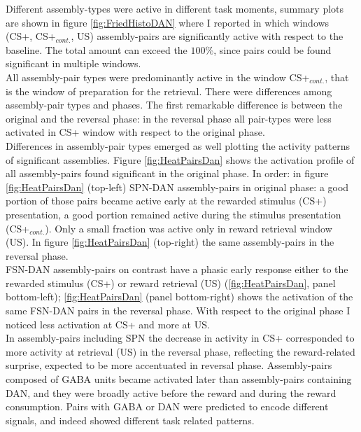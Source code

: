 Different assembly-types were active in different task moments, summary plots are shown in figure \ref{fig:FriedHistoDAN} where I reported in which windows (CS+, CS+$_{cont.}$, US) assembly-pairs are significantly active with respect to the baseline. The total amount can exceed the $100\%$, since pairs could be found significant in multiple windows.\\All assembly-pair types were predominantly active in the window CS+$_{cont.}$, that is the window of preparation for the retrieval. There were differences among assembly-pair types and phases. The first remarkable difference is between the original and the reversal phase: in the reversal phase all pair-types were less activated in CS+ window with respect to the original phase.\\Differences in assembly-pair types emerged as well plotting the activity patterns of significant assemblies. Figure \ref{fig:HeatPairsDan} shows the activation profile of all assembly-pairs found significant in the original phase. In order: in figure \ref{fig:HeatPairsDan} (top-left) SPN-DAN assembly-pairs in original phase: a good portion of those pairs became active early at the rewarded stimulus (CS+) presentation, a good portion remained active during the stimulus presentation (CS+$_{cont.}$). Only a small fraction was active only in reward retrieval window (US). In figure \ref{fig:HeatPairsDan} (top-right) the same assembly-pairs in the reversal phase.\\FSN-DAN assembly-pairs on contrast have a phasic early response either to the rewarded stimulus (CS+) or reward retrieval (US) (\ref{fig:HeatPairsDan}, panel bottom-left); \ref{fig:HeatPairsDan} (panel bottom-right) shows the activation of the same FSN-DAN pairs in the reversal phase. With respect to the original phase I noticed less activation at CS+ and more at US.\\In assembly-pairs including SPN the decrease in activity in CS+ corresponded to more activity at retrieval (US) in the reversal phase, reflecting the reward-related surprise, expected to be more accentuated in reversal phase. Assembly-pairs composed of GABA units became activated later than assembly-pairs containing DAN, and they were broadly active before the reward and during the reward consumption. Pairs with GABA or DAN were predicted to encode different signals, and indeed showed different task related patterns.
